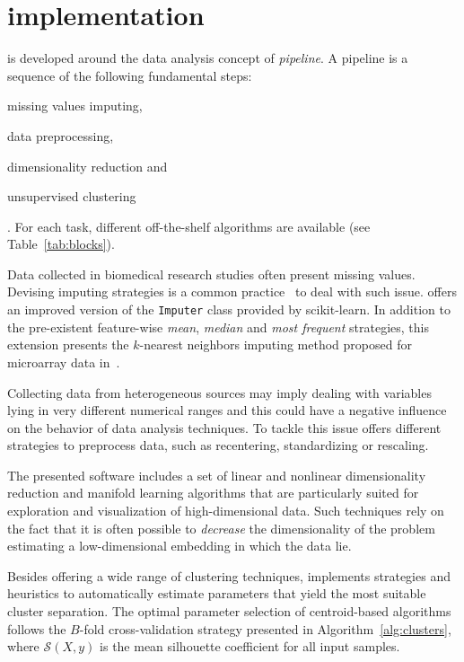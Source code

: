 \section{\ade implementation} \label{sec:adenine_implementation}
\ade is developed around the data analysis concept of \emph{pipeline}. A pipeline is a sequence of the following fundamental steps:
\begin{enumerate*}[label=(\roman*)]
  \item missing values imputing,
  \item data preprocessing,
  \item dimensionality reduction and
  \item unsupervised clustering
\end{enumerate*}.
For each task, different off-the-shelf algorithms are available (see Table~\ref{tab:blocks}).

Data collected in biomedical research studies often present missing values.
Devising imputing strategies is a common practice~\cite{de2015impact} to deal with such issue.
\ade offers an improved version of the {\footnotesize \texttt{Imputer}} class provided by {\sc scikit-learn}. In addition to the pre-existent feature-wise \emph{mean}, \emph{median} and \emph{most frequent} strategies, this extension presents the $k$-nearest neighbors imputing method proposed for microarray data in~\cite{troyanskaya2001missing}.

Collecting data from heterogeneous sources may imply dealing with variables lying in very different numerical ranges and this could have a negative influence on the behavior of data analysis techniques. To tackle this issue \ade offers different strategies to preprocess data, such as recentering, standardizing or rescaling.

The presented software includes a set of linear and nonlinear dimensionality reduction and manifold learning algorithms that are particularly suited for exploration and visualization of high-dimensional data. Such techniques rely on the fact that it is often possible to \emph{decrease} the dimensionality of the problem estimating a low-dimensional embedding in which the data lie.

Besides offering a wide range of clustering techniques,
\ade implements strategies and heuristics to automatically estimate parameters that yield the most suitable cluster separation.
The optimal parameter selection of centroid-based algorithms follows the $B$-fold cross-validation strategy presented in Algorithm~\ref{alg:clusters}, where $\mathcal{S}(X,y)$ is the mean silhouette coefficient \cite{rousseeuw1987silhouettes} for all input samples.

